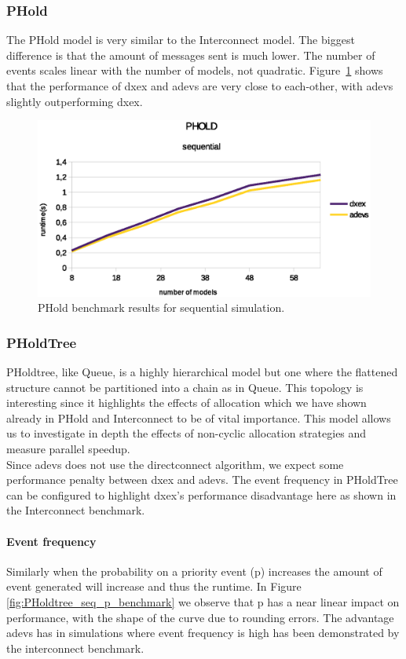 \subsubsection{PHold}\label{4-seq-PHold}
The PHold model is very similar to the Interconnect model. The biggest difference is that the amount of messages sent is much lower. The number of events scales linear with the number of models, not quadratic. Figure~\ref{fig:Phold_benchmark} shows that the performance of dxex and adevs are very close to each-other, with adevs slightly outperforming dxex.
\begin{figure}
	\center
	\includegraphics[width=\plotfraction\columnwidth]{fig/phold_sequential.eps}
	\caption{PHold benchmark results for sequential simulation.}
	\label{fig:Phold_benchmark}
\end{figure}
\subsubsection{PHoldTree}
PHoldtree, like Queue, is a highly hierarchical model but one where the flattened structure cannot be partitioned into a chain as in Queue.
This topology is interesting since it highlights the effects of allocation which we have shown already in PHold and Interconnect to be of vital importance. This model allows us to investigate in depth the effects of non-cyclic allocation strategies and measure parallel speedup.\\
Since adevs does not use the directconnect algorithm, we expect some performance penalty between dxex and adevs. The event frequency in PHoldTree can be configured to highlight dxex's performance disadvantage here as shown in the Interconnect benchmark.
\paragraph*{Event frequency}
Similarly when the probability on a priority event (p) increases the amount of event generated will increase and thus the runtime. In Figure \ref{fig:PHoldtree_seq_p_benchmark} we observe that p has a near linear impact on performance, with the shape of the curve due to rounding errors. The advantage adevs has in simulations where event frequency is high has been demonstrated by the interconnect benchmark. 
